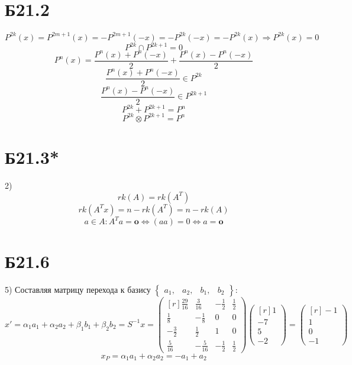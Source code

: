 \documentclass[a4paper,12pt]{article} %
\begin{document}
\section*{Б21.2}
$$P^{2k}(x)=P^{2m+1}(x)=-P^{2m+1}(-x)=-P^{2k}(-x)=-P^{2k}(x)\Rightarrow P^{2k}(x)=0$$
$$P^{2k}\cap P^{2k+1}={0}$$
$$P^{n}(x)=\frac{P^{n}(x)+P^{n}(-x)}{2}+\frac{P^{n}(x)-P^{n}(-x)}{2}$$
$$\frac{P^{n}(x)+P^{n}(-x)}{2}\in P^{2k}$$
$$\frac{P^{n}(x)-P^{n}(-x)}{2}\in P^{2k+1}$$
$$P^{2k}+ P^{2k+1}=P^n$$
$$P^{2k}\otimes P^{2k+1}=P^{n}$$
\section*{Б21.3*}2)
$$rk(A)=rk(A^{T})$$
$$rk(A^{T}x)=n-rk(A^{T})=n-rk(A)$$
$$a\in A:A^{T}a=\textbf{o}\Leftrightarrow (aa)=0\Leftrightarrow a=\textbf{o}$$
\section*{Б21.6}5)
Составляя матрицу перехода к базису $\begin{Bmatrix}
a_1,&a_2,&b_1,&b_2
\end{Bmatrix}$:
\begin{equation*}
x'=\alpha_1a_1+\alpha_2a_2+\beta_1b_1+\beta_2b_2=S^{-1}x=
\begin{pmatrix*}[r]
\frac{29}{16}&\frac{3}{16}&-\frac{1}{2}&\frac{1}{2}\\
\frac{1}{8}&-\frac{1}{8}&0&0\\
-\frac{3}{2}&\frac{1}{2}&1&0\\
\frac{5}{16}&-\frac{5}{16}&-\frac{1}{2}&\frac{1}{2}
\end{pmatrix*}\begin{pmatrix*}[r]
1\\
-7\\
5\\
-2
\end{pmatrix*}=\begin{pmatrix*}[r]
-1\\
1\\
0\\
-1
\end{pmatrix*}
\end{equation*}
$$x_P=\alpha_1a_1+\alpha_2a_2=-a_1+a_2$$
\end{document}
